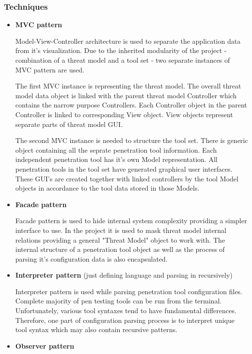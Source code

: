\subsubsection{Techniques}
\begin{itemize}
	\item \textbf{MVC pattern}
	
	Model-View-Controller architecture is used to separate the application data from it's visualization. Due to the inherited modularity of the project - combination of a threat model and a tool set - two separate instances of MVC pattern are used. 
	
	The first MVC instance is representing the threat model. The overall threat model data object is linked with the parent threat model Controller which contains the narrow purpose Controllers. Each Controller object in the parent Controller is linked to corresponding View object. View objects represent separate parts of threat model GUI. 
	
	The second MVC instance is needed to structure the tool set. There is generic object containing all the seprate penetration tool information. Each independent penetration tool has it's own Model representation. All penetration tools in the tool set have generated graphical user interfaces. These GUI's are created together with linked controllers by the tool Model objects in accordance to the tool data stored in those Models.
	
	\item \textbf{Facade pattern}
	
	Facade pattern is used to hide internal system complexity providing a simpler interface to use. In the project it is used to mask threat model internal relations providing a general "Threat Model" object to work with. The internal structure of a penetration tool object as well as the process of parsing it's configuration data is also encapsulated.
	
	\item \textbf{Interpreter pattern} (just defining language and parsing in recursively)
	
	Interpreter pattern is used while parsing penetration tool configuration files. Complete majority of pen testing tools can be run from the terminal. Unfortunately, various tool syntaxes tend to have fundamental differences. Therefore, one part of configuration parsing process is to interpret unique tool syntax which may also contain recursive patterns.
	
	\item \textbf{Observer pattern}
	

\end{itemize}
